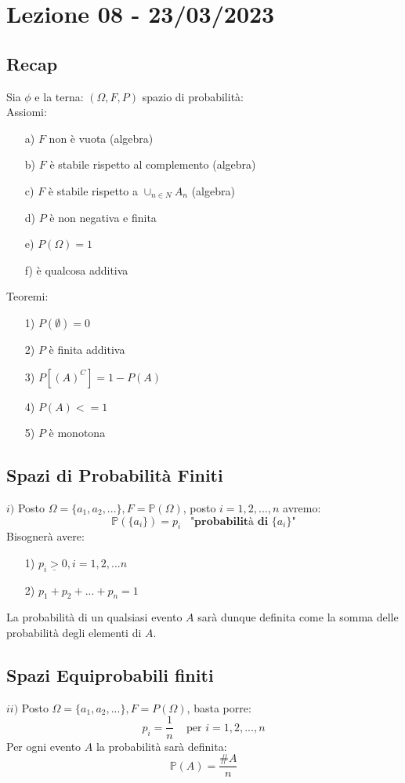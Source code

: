 \section{Lezione 08 - 23/03/2023}

\subsection{Recap}
Sia $\phi$ e la terna: $(\Omega, F, P)$ spazio di probabilità:\\
Assiomi:
\begin{itemize}
\item[a)] $F$ non è vuota (algebra)
\item[b)] $F$ è stabile rispetto al complemento (algebra)
\item[c)] $F$ è stabile rispetto a $\cup_{n \in N}A_n$ (algebra)
\item[d)] $P$ è non negativa e finita
\item[e)] $P(\Omega) = 1$
\item[f)] è qualcosa additiva
\end{itemize}
Teoremi:
\begin{itemize}
\item[1)] $P(\emptyset) = 0$
\item[2)] $P$ è finita additiva
\item[3)] $P[(A)^C] = 1-P(A)$
\item[4)] $P(A) <= 1$
\item[5)] $P$ è monotona
\end{itemize}

\subsection{Spazi di Probabilità Finiti}
$i)$ Posto $\Omega = \{a_1, a_2,...\}, F = \mathbb{P}(\Omega)$, posto $ i=1,2,...,n$ avremo:
$$  \mathbb{P}(\{a_i\}) = \textit{p}_i \;\;\; \textbf{"probabilità di \{$a_i$\}"} $$
Bisognerà avere:
\begin{itemize}
\item[1)] $ \textit{p}_i \underline{>} 0, i=1,2,...n $
\item[2)] $ \textit{p}_1 +   \textit{p}_2 +  ... +  \textit{p}_n  = 1 $
\end{itemize}
La probabilità di un qualsiasi evento $A$ sarà dunque definita come la somma delle probabilità degli elementi di $A$.

\subsection{Spazi Equiprobabili finiti}
$ii)$ Posto $\Omega = \{a_1, a_2,...\}, F = P(\Omega)$, basta porre:
$$ \textit{p}_i = \frac{1}{n} \;\;\; \text{ per } i=1,2,...,n $$
Per ogni evento $A$ la probabilità sarà definita:
$$ \mathbb{P}(A) = \frac{\#A}{n} $$

